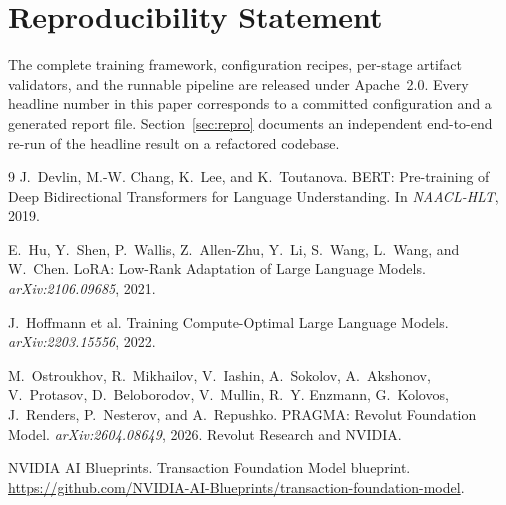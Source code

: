\documentclass[10pt,letterpaper]{article}
\begin{document}
\section*{Reproducibility Statement}
The complete training framework, configuration recipes, per-stage artifact validators, and the
runnable pipeline are released under Apache~2.0. Every headline number in this paper corresponds to
a committed configuration and a generated report file. Section~\ref{sec:repro} documents an
independent end-to-end re-run of the headline result on a refactored codebase.

\begin{thebibliography}{9}
J.~Devlin, M.-W. Chang, K.~Lee, and K.~Toutanova.
\newblock BERT: Pre-training of Deep Bidirectional Transformers for Language Understanding.
\newblock In \emph{NAACL-HLT}, 2019.

E.~Hu, Y.~Shen, P.~Wallis, Z.~Allen-Zhu, Y.~Li, S.~Wang, L.~Wang, and W.~Chen.
\newblock LoRA: Low-Rank Adaptation of Large Language Models.
\newblock \emph{arXiv:2106.09685}, 2021.

J.~Hoffmann et al.
\newblock Training Compute-Optimal Large Language Models.
\newblock \emph{arXiv:2203.15556}, 2022.

M.~Ostroukhov, R.~Mikhailov, V.~Iashin, A.~Sokolov, A.~Akshonov, V.~Protasov, D.~Beloborodov,
V.~Mullin, R.~Y. Enzmann, G.~Kolovos, J.~Renders, P.~Nesterov, and A.~Repushko.
\newblock PRAGMA: Revolut Foundation Model.
\newblock \emph{arXiv:2604.08649}, 2026. Revolut Research and NVIDIA.

NVIDIA AI Blueprints.
\newblock Transaction Foundation Model blueprint.
\newblock \url{https://github.com/NVIDIA-AI-Blueprints/transaction-foundation-model}.
\end{thebibliography}
\end{document}

